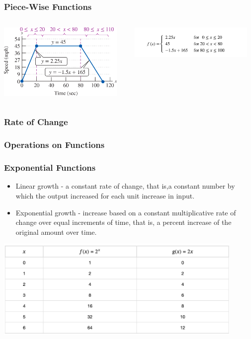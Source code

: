 \documentclass{beamer}
\begin{document}
\begin{frame}\frametitle{Piece-Wise Functions}
\begin{columns}
\begin{column}{6cm}
\begin{center}
\includegraphics[width=6cm]{fig/pwfunct1.png}
\end{center}
\end{column}
\begin{column}{5cm}
\begin{center}
\includegraphics[width=6cm]{fig/pwfunct2.jpg}
\end{center}
\end{column}
\end{columns}
\end{frame}

\begin{frame}\frametitle{Rate of Change}

\end{frame}

\begin{frame}\frametitle{Operations on Functions}

\end{frame}


\begin{frame}\frametitle{Exponential Functions}
\begin{itemize}
\item Linear growth - a constant rate of change, that is,a constant number by which the output increased for each unit increase in input.
\item Exponential growth - increase based on a constant multiplicative rate of change over equal increments of time, that is, a percent increase of the original amount over time.
\end{itemize}

\begin{center}
\includegraphics[width=12cm]{fig/exp_growth.jpg}
\end{center}

\end{frame}
\end{document}
